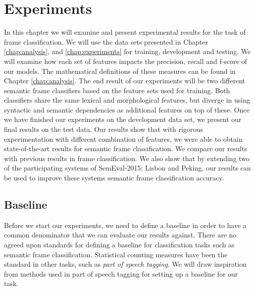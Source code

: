 \chapter{Experiments}
\label{chap:results}


In this chapter we will examine and present experimental results for the task of frame classification. We will use the data sets presented in Chapter \ref{chap:analysis}, and \ref{chap:experiments} for training, development and testing. We will examine how each set of features impacts the precision, recall and f-score of our models. The mathematical definitions of these measures can be found in Chapter \ref{chap:analysis}. The end result of our experiments will be two different semantic frame classifiers based on the feature sets used for training. Both classifiers share the same lexical and morphological features, but diverge in using syntactic and semantic dependencies as additional features on top of these. Once we have finished our experiments on the development data set, we present our final results on the test data. Our results show that with rigorous experimentation with different combination of features, we were able to obtain state-of-the-art results for semantic frame classification. We compare our results with previous results in frame classification. We also show that by extending two of the participating systems of SemEval-2015: Lisbon and Peking, our results can be used to improve these systems semantic frame classification accuracy.


\section{Baseline}

Before we start our experiments, we need to define a baseline in order to have a common denominator that we can evaluate our results against. There are no agreed upon standards for defining a baseline for classification tasks such as semantic frame classification. Statistical counting measures have been the standard in other tasks, such as \textit{part of speech tagging}. We will draw inspiration from methods used in part of speech tagging for setting up a baseline for our task.

